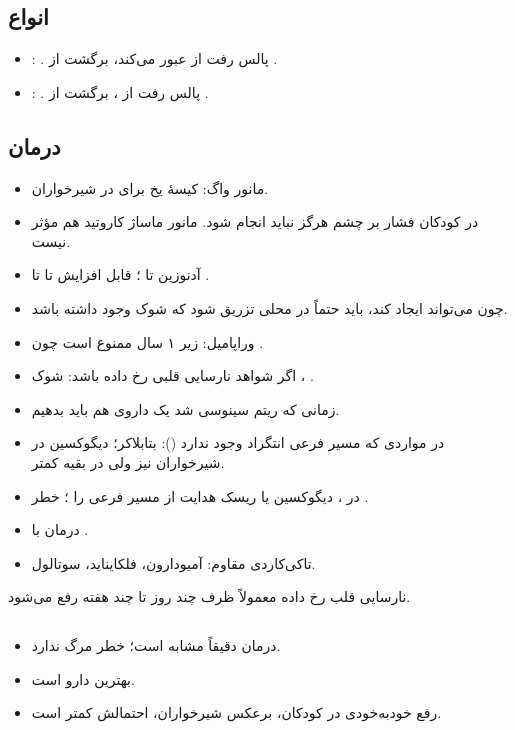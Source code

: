 \documentclass[12pt,a4paper]{article}
\begin{document}
\subsection*{انواع }
\begin{itemize}
\item {}: . پالس رفت از  عبور می‌کند، برگشت از .
\item {}: . پالس رفت از ، برگشت از .
\end{itemize}
\subsection*{درمان}
\begin{itemize}
\item مانور واگ: کیسهٔ یخ برای  در شیرخواران.
\item در کودکان فشار بر چشم هرگز نباید انجام شود. مانور ماساژ کاروتید هم مؤثر نیست.
\item آدنوزین  تا ؛ قابل افزایش تا  تا .
\item چون می‌تواند  ایجاد کند، باید حتماً در محلی تزریق شود که  شوک وجود داشته باشد.
\item وراپامیل: زیر ۱ سال ممنوع است چون .
\item اگر شواهد نارسایی قلبی رخ داده باشد: شوک ، .
\item زمانی که ریتم سینوسی شد یک داروی  هم باید بدهیم.
\item در مواردی که مسیر فرعی انتگراد وجود ندارد (): بتابلاکر؛ دیگوکسین در شیرخواران نیز ولی در بقیه کمتر.
\item در ، دیگوکسین یا  ریسک هدایت از مسیر فرعی را \DRm{\uparrow}؛ خطر .
\item درمان با .
\item تاکی‌کاردی مقاوم: آمیودارون، فلکایناید، سوتالول.
\end{itemize}
نارسایی قلب رخ داده معمولاً ظرف چند روز تا چند هفته رفع می‌شود.
\subsection*{}
\begin{itemize}
\item درمان  دقیقاً مشابه  است؛ خطر مرگ ندارد.
\item بهترین دارو  است.
\item رفع خودبه‌خودی  در کودکان، برعکس شیرخواران، احتمالش کمتر است.
\end{itemize}
\end{document}
